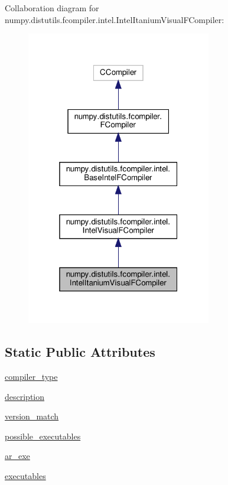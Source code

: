 Collaboration diagram for numpy.\+distutils.\+fcompiler.\+intel.\+Intel\+Itanium\+Visual\+F\+Compiler\+:
\nopagebreak
\begin{figure}[H]
\begin{center}
\leavevmode
\includegraphics[width=229pt]{classnumpy_1_1distutils_1_1fcompiler_1_1intel_1_1IntelItaniumVisualFCompiler__coll__graph}
\end{center}
\end{figure}
\subsection*{Static Public Attributes}
\begin{DoxyCompactItemize}
\item 
\hyperlink{classnumpy_1_1distutils_1_1fcompiler_1_1intel_1_1IntelItaniumVisualFCompiler_a729e00d8fe34467bcf60daeb34e39f95}{compiler\+\_\+type}
\item 
\hyperlink{classnumpy_1_1distutils_1_1fcompiler_1_1intel_1_1IntelItaniumVisualFCompiler_af9923cd22de436b5bdb374a6a281929d}{description}
\item 
\hyperlink{classnumpy_1_1distutils_1_1fcompiler_1_1intel_1_1IntelItaniumVisualFCompiler_a2c7c6428c972bc320aa9fb69d6892ac4}{version\+\_\+match}
\item 
\hyperlink{classnumpy_1_1distutils_1_1fcompiler_1_1intel_1_1IntelItaniumVisualFCompiler_a07b5e4ad5186538b2685671f1f37f8ae}{possible\+\_\+executables}
\item 
\hyperlink{classnumpy_1_1distutils_1_1fcompiler_1_1intel_1_1IntelItaniumVisualFCompiler_a0a84f6f9751ae822d0ded05894b96ab4}{ar\+\_\+exe}
\item 
\hyperlink{classnumpy_1_1distutils_1_1fcompiler_1_1intel_1_1IntelItaniumVisualFCompiler_a687620513b5578ad474ade675d9b540d}{executables}
\end{DoxyCompactItemize}
